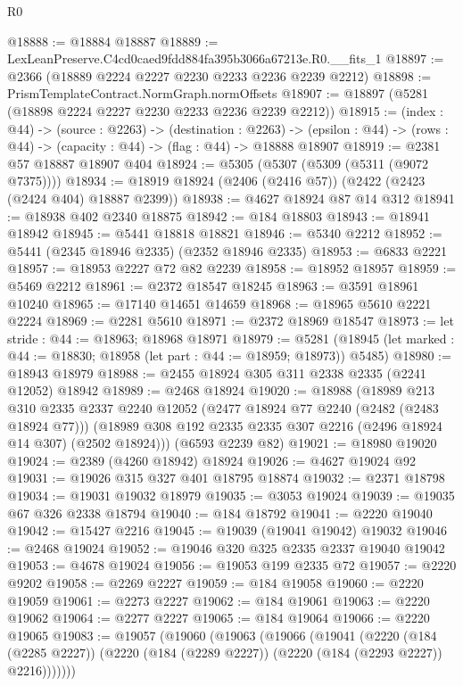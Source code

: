 \begin{lexlean}{R0}
\begin{coremodule}
@18888 := @18884 @18887
@18889 := LexLeanPreserve.C4cd0caed9fdd884fa395b3066a67213e.R0.__fits_1
@18897 := @2366 (@18889 @2224 @2227 @2230 @2233 @2236 @2239 @2212)
@18898 := PrismTemplateContract.NormGraph.normOffsets
@18907 := @18897 (@5281 (@18898 @2224 @2227 @2230 @2233 @2236 @2239 @2212))
@18915 := (index : @44) ->
  (source : @2263) ->
  (destination : @2263) ->
  (epsilon : @44) -> (rows : @44) -> (capacity : @44) -> (flag : @44) -> @18888 @18907
@18919 := @2381 @57 @18887 @18907 @404
@18924 := @5305 (@5307 (@5309 (@5311 (@9072 @7375))))
@18934 := @18919 @18924 (@2406 (@2416 @57)) (@2422 (@2423 (@2424 @404) @18887 @2399))
@18938 := @4627 @18924 @87 @14 @312
@18941 := @18938 @402 @2340 @18875
@18942 := @184 @18803
@18943 := @18941 @18942
@18945 := @5441 @18818 @18821
@18946 := @5340 @2212
@18952 := @5441 (@2345 @18946 @2335) (@2352 @18946 @2335)
@18953 := @6833 @2221
@18957 := @18953 @2227 @72 @82 @2239
@18958 := @18952 @18957
@18959 := @5469 @2212
@18961 := @2372 @18547 @18245
@18963 := @3591 @18961 @10240
@18965 := @17140 @14651 @14659
@18968 := @18965 @5610 @2221 @2224
@18969 := @2281 @5610
@18971 := @2372 @18969 @18547
@18973 := let stride : @44 := @18963; @18968 @18971
@18979 := @5281
    (@18945 (let marked : @44 := @18830; @18958 (let part : @44 := @18959; @18973)) @5485)
@18980 := @18943 @18979
@18988 := @2455 @18924 @305 @311 @2338 @2335 (@2241 @12052) @18942
@18989 := @2468 @18924
@19020 := @18988
    (@18989
      @213
      @310
      @2335
      @2337
      @2240
      @12052
      (@2477 @18924 @77 @2240 (@2482 (@2483 @18924 @77)))
      (@18989 @308 @192 @2335 @2335 @307 @2216 (@2496 @18924 @14 @307) (@2502 @18924)))
    (@6593 @2239 @82)
@19021 := @18980 @19020
@19024 := @2389 (@4260 @18942) @18924
@19026 := @4627 @19024 @92
@19031 := @19026 @315 @327 @401 @18795 @18874
@19032 := @2371 @18798
@19034 := @19031 @19032 @18979
@19035 := @3053 @19024
@19039 := @19035 @67 @326 @2338 @18794
@19040 := @184 @18792
@19041 := @2220 @19040
@19042 := @15427 @2216
@19045 := @19039 (@19041 @19042) @19032
@19046 := @2468 @19024
@19052 := @19046 @320 @325 @2335 @2337 @19040 @19042
@19053 := @4678 @19024
@19056 := @19053 @199 @2335 @72
@19057 := @2220 @9202
@19058 := @2269 @2227
@19059 := @184 @19058
@19060 := @2220 @19059
@19061 := @2273 @2227
@19062 := @184 @19061
@19063 := @2220 @19062
@19064 := @2277 @2227
@19065 := @184 @19064
@19066 := @2220 @19065
@19083 := @19057
    (@19060
      (@19063
        (@19066
          (@19041
            (@2220
              (@184 (@2285 @2227))
              (@2220 (@184 (@2289 @2227)) (@2220 (@184 (@2293 @2227)) @2216)))))))

\end{coremodule}
\end{lexlean}
